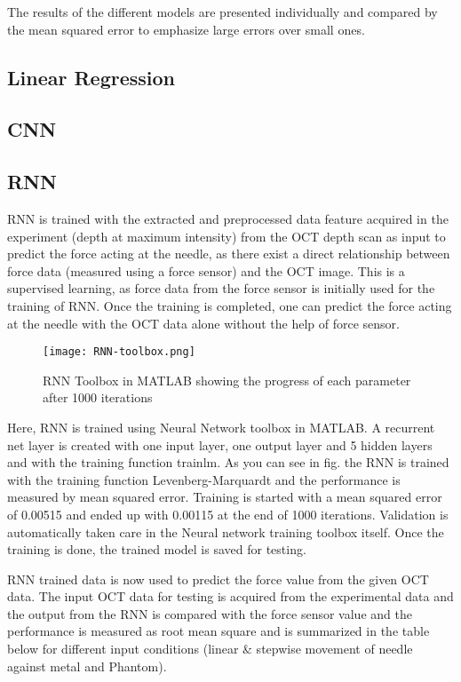 
The results of the different models are presented individually and compared by the mean squared error to emphasize 
large errors over small ones.

\subsection{Linear Regression}
\subsection{CNN}
\subsection{RNN}
      RNN is trained with the extracted and preprocessed data feature acquired in the experiment (depth at maximum intensity) from the OCT depth scan as input to predict the force acting at the needle, as there exist a direct relationship between force data (measured using a force sensor) and the OCT image. This is a supervised learning, as force data from the force sensor is initially used for the training of RNN. Once the training is completed, one can predict the force acting at the needle with the OCT data alone without the help of force sensor.
      
      \begin{figure}
    \centering
    \texttt{[image: RNN-toolbox.png]}
    \caption{RNN Toolbox in MATLAB showing the progress of each parameter after 1000 iterations}
    \label{fig:RNN-toolbox}
\end{figure}
      
      Here, RNN is trained using Neural Network toolbox in MATLAB. A recurrent net layer is created with one input layer, one output layer and 5 hidden layers and with the training function trainlm. As you can see in fig. the RNN is trained with the training function Levenberg-Marquardt and the performance is measured by mean squared error. Training is started with a mean squared error of 0.00515 and ended up with 0.00115 at the end of 1000 iterations. Validation is automatically taken care in the Neural network training toolbox itself. Once the training is done, the trained model is saved for testing. 
      
      RNN trained data is now used to predict the force value from the given OCT data. The input OCT data for testing is acquired from the experimental data and the output from the RNN is compared with the force sensor value and the performance is measured as root mean square and is summarized in the table below for different input conditions (linear & stepwise movement of needle against metal and Phantom). 


